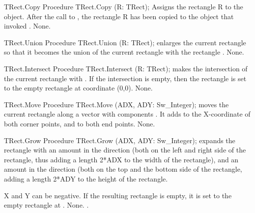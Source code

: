 \begin{procedure}{TRect.Copy}
\Declaration     
Procedure TRect.Copy (R: TRect);
\Description
Assigns the rectangle R to the object. After the call to , the
rectangle R has been copied to the object that invoked .
\Errors
None.
\SeeAlso
{}
\end{procedure}

\html{}

\begin{procedure}{TRect.Union}
\Declaration
Procedure TRect.Union (R: TRect);
\Description
{} enlarges the current rectangle so that it becomes the union
of the current rectangle with the rectangle .
\Errors
None.
\SeeAlso
{}
\end{procedure}

\html{}

\begin{procedure}{TRect.Intersect}
\Declaration
Procedure TRect.Intersect (R: TRect);
\Description
{} makes the intersection of the current rectangle with
. If the intersection is empty, then the rectangle is set to the empty
rectangle at coordinate (0,0).
\Errors
None.
\SeeAlso
{}
\end{procedure}

\html{}

\begin{procedure}{TRect.Move}
\Declaration
Procedure TRect.Move (ADX, ADY: Sw\_Integer);
\Description
{} moves the current rectangle along a vector with components
. It adds  to the X-coordinate of both corner
points, and  to both end points.
\Errors
None.
\SeeAlso
{}
\end{procedure}

\html{}

\begin{procedure}{TRect.Grow}
\Declaration
Procedure TRect.Grow (ADX, ADY: Sw\_Integer);
\Description
{} expands the rectangle with an amount  in the 
direction (both on the left and right side of the rectangle, thus adding a 
length 2*ADX to the width of the rectangle), and an amount  in 
the  direction (both on the top and the bottom side of the rectangle,
adding a length 2*ADY to the height of the rectangle. 

X and Y can be negative. If the resulting rectangle is empty, it is set 
to the empty rectangle at .
\Errors
None.
\SeeAlso
{}.
\end{procedure}


